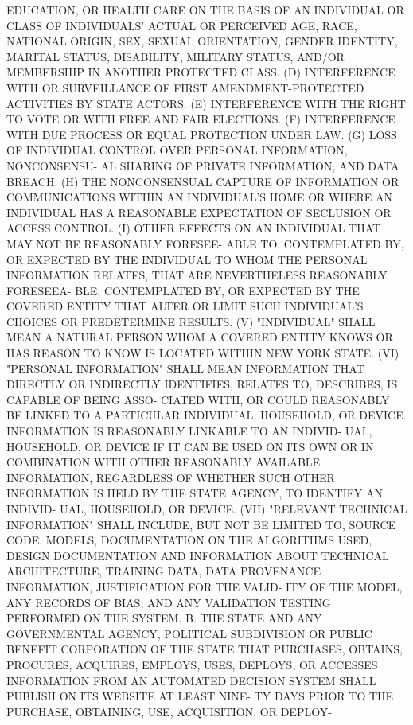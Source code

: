  EDUCATION,  OR  HEALTH  CARE  ON  THE BASIS OF AN INDIVIDUAL OR CLASS OF
 INDIVIDUALS' ACTUAL OR PERCEIVED AGE, RACE, NATIONAL ORIGIN, SEX, SEXUAL
 ORIENTATION,  GENDER  IDENTITY,  MARITAL  STATUS,  DISABILITY,  MILITARY
 STATUS, AND/OR MEMBERSHIP IN ANOTHER PROTECTED CLASS.
   (D)  INTERFERENCE  WITH  OR  SURVEILLANCE OF FIRST AMENDMENT-PROTECTED
 ACTIVITIES BY STATE ACTORS.
   (E) INTERFERENCE WITH  THE  RIGHT  TO  VOTE  OR  WITH  FREE  AND  FAIR
 ELECTIONS.
   (F) INTERFERENCE WITH DUE PROCESS OR EQUAL PROTECTION UNDER LAW.
   (G) LOSS OF INDIVIDUAL CONTROL OVER PERSONAL INFORMATION, NONCONSENSU-
 AL SHARING OF PRIVATE INFORMATION, AND DATA BREACH.
   (H)  THE NONCONSENSUAL CAPTURE OF INFORMATION OR COMMUNICATIONS WITHIN
 AN INDIVIDUAL'S HOME OR WHERE AN INDIVIDUAL HAS A REASONABLE EXPECTATION
 OF SECLUSION OR ACCESS CONTROL.
   (I) OTHER EFFECTS ON AN INDIVIDUAL THAT MAY NOT BE REASONABLY FORESEE-
 ABLE TO, CONTEMPLATED BY, OR EXPECTED BY  THE  INDIVIDUAL  TO  WHOM  THE
 PERSONAL INFORMATION RELATES, THAT ARE NEVERTHELESS REASONABLY FORESEEA-
 BLE,  CONTEMPLATED  BY,  OR EXPECTED BY THE COVERED ENTITY THAT ALTER OR
 LIMIT SUCH INDIVIDUAL'S CHOICES OR PREDETERMINE RESULTS.
   (V) "INDIVIDUAL" SHALL MEAN A NATURAL PERSON  WHOM  A  COVERED  ENTITY
 KNOWS OR HAS REASON TO KNOW IS LOCATED WITHIN NEW YORK STATE.
   (VI)  "PERSONAL  INFORMATION"  SHALL MEAN INFORMATION THAT DIRECTLY OR
 INDIRECTLY IDENTIFIES, RELATES TO, DESCRIBES, IS CAPABLE OF BEING  ASSO-
 CIATED  WITH,  OR COULD REASONABLY BE LINKED TO A PARTICULAR INDIVIDUAL,
 HOUSEHOLD, OR DEVICE. INFORMATION IS REASONABLY LINKABLE TO AN  INDIVID-
 UAL, HOUSEHOLD, OR DEVICE IF IT CAN BE USED ON ITS OWN OR IN COMBINATION
 WITH  OTHER REASONABLY AVAILABLE INFORMATION, REGARDLESS OF WHETHER SUCH
 OTHER INFORMATION IS HELD BY THE STATE AGENCY, TO IDENTIFY  AN  INDIVID-
 UAL, HOUSEHOLD, OR DEVICE.
   (VII)  "RELEVANT  TECHNICAL  INFORMATION"  SHALL  INCLUDE,  BUT NOT BE
 LIMITED TO, SOURCE CODE, MODELS, DOCUMENTATION ON THE  ALGORITHMS  USED,
 DESIGN  DOCUMENTATION  AND  INFORMATION  ABOUT  TECHNICAL  ARCHITECTURE,
 TRAINING DATA, DATA PROVENANCE INFORMATION, JUSTIFICATION FOR THE VALID-
 ITY OF THE MODEL, ANY  RECORDS  OF  BIAS,  AND  ANY  VALIDATION  TESTING
 PERFORMED ON THE SYSTEM.
   B.  THE  STATE  AND  ANY GOVERNMENTAL AGENCY, POLITICAL SUBDIVISION OR
 PUBLIC  BENEFIT  CORPORATION  OF  THE  STATE  THAT  PURCHASES,  OBTAINS,
 PROCURES, ACQUIRES, EMPLOYS, USES, DEPLOYS, OR ACCESSES INFORMATION FROM
 AN AUTOMATED DECISION SYSTEM SHALL PUBLISH ON ITS WEBSITE AT LEAST NINE-
 TY  DAYS  PRIOR TO THE PURCHASE, OBTAINING, USE, ACQUISITION, OR DEPLOY-
